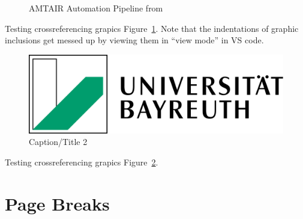 \documentclass[
  11pt,
  letterpaper,
]{book}
\begin{document}
\begin{figure}


\caption[Five-step AMTAIR automation pipeline from PDFs to Bayesian
networks]{\label{fig-automation_pipeline}AMTAIR Automation Pipeline
from}

\end{figure}%

Testing crossreferencing grapics Figure~\ref{fig-automation_pipeline}.
Note that the indentations of graphic inclusions get messed up by
viewing them in ``view mode'' in VS code.

\begin{figure}

\includegraphics[width=0.3\linewidth,height=\textheight,keepaspectratio]{images/cover.png}

\caption[Short 2 caption]{\label{fig-testgraphic2}Caption/Title 2}

\end{figure}%

Testing crossreferencing grapics Figure~\ref{fig-testgraphic2}.

\section*{Page Breaks}\label{page-breaks}
\end{document}
